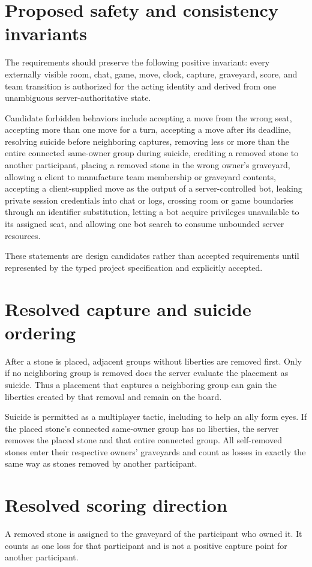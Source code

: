 \documentclass[11pt,oneside]{book}
\begin{document}
\section{Proposed safety and consistency invariants}
The requirements should preserve the following positive invariant: every externally visible room, chat, game, move, clock, capture, graveyard, score, and team transition is authorized for the acting identity and derived from one unambiguous server-authoritative state.

Candidate forbidden behaviors include accepting a move from the wrong seat, accepting more than one move for a turn, accepting a move after its deadline, resolving suicide before neighboring captures, removing less or more than the entire connected same-owner group during suicide, crediting a removed stone to another participant, placing a removed stone in the wrong owner's graveyard, allowing a client to manufacture team membership or graveyard contents, accepting a client-supplied move as the output of a server-controlled bot, leaking private session credentials into chat or logs, crossing room or game boundaries through an identifier substitution, letting a bot acquire privileges unavailable to its assigned seat, and allowing one bot search to consume unbounded server resources.

These statements are design candidates rather than accepted requirements until represented by the typed project specification and explicitly accepted.

\section{Resolved capture and suicide ordering}
After a stone is placed, adjacent groups without liberties are removed first. Only if no neighboring group is removed does the server evaluate the placement as suicide. Thus a placement that captures a neighboring group can gain the liberties created by that removal and remain on the board.

Suicide is permitted as a multiplayer tactic, including to help an ally form eyes. If the placed stone's connected same-owner group has no liberties, the server removes the placed stone and that entire connected group. All self-removed stones enter their respective owners' graveyards and count as losses in exactly the same way as stones removed by another participant.

\section{Resolved scoring direction}
A removed stone is assigned to the graveyard of the participant who owned it. It counts as one loss for that participant and is not a positive capture point for another participant.
\end{document}
